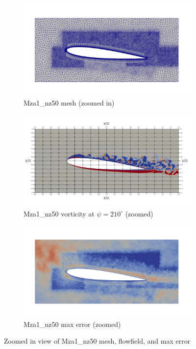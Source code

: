 \begin{figure}[H]
	\centering
\begin{subfigure}[b]{0.7\textwidth}
	\centering
	\includegraphics[width=1\textwidth]{figures/adapt_strat/zoomed/Mza1_mesh.png}
	\caption{Mza1\_nz50 mesh (zoomed in)}
	\label{fig:Mza1_mesh_zoomed}
\end{subfigure}
\begin{subfigure}[b]{0.7\textwidth}
	\centering
	\includegraphics[width=1\textwidth]{figures/adapt_strat/zoomed/Mza1_ph_210.png}
	\caption{Mza1\_nz50 vorticity at $\psi=210^\circ$ (zoomed)}
	\label{fig:Mza1_vorticity_zoomed}
\end{subfigure}
\begin{subfigure}[b]{0.7\textwidth}
	\centering
	\includegraphics[width=1\textwidth]{figures/adapt_strat/zoomed/Mza1_max_error.png}
	\caption{Mza1\_nz50 max error (zoomed)}
	\label{fig:Mza1_max_error_zoomed}
\end{subfigure}


\label{fig:Mza1_zoomed}
\caption{Zoomed in view of Mza1\_nz50 mesh, flowfield, and max error}
\end{figure}


